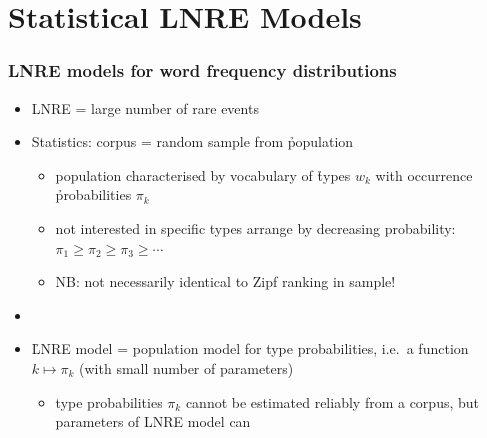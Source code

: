 \documentclass[t]{beamer} %
\begin{document}
\section{Statistical LNRE Models}

\begin{frame}
  \frametitle{LNRE models for word frequency distributions}

  \begin{itemize}
  \item LNRE = large number of rare events \citep[cf.][]{Baayen:01}
  \item Statistics: corpus = random sample from \h{population}
    \begin{itemize}
    \item population characterised by vocabulary of \h{types} $w_k$ with
      occurrence \h{probabilities} $\pi_k$
    \item not interested in specific types \so arrange by decreasing
      probability: $\pi_1\geq \pi_2\geq \pi_3 \geq \cdots$
    \item NB: not necessarily identical to Zipf ranking in sample!
    \end{itemize}
  \item[]\pause
  \item \h{LNRE model} = population model for type probabilities, i.e.\ a
    function $k \mapsto \pi_k$ (with small number of parameters)
    \begin{itemize}
    \item type probabilities $\pi_k$ cannot be estimated reliably from a
      corpus, but parameters of LNRE model can
    \end{itemize}
  \end{itemize}
\end{frame}
\end{document}
